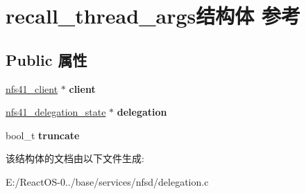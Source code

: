 \hypertarget{structrecall__thread__args}{}\section{recall\+\_\+thread\+\_\+args结构体 参考}
\label{structrecall__thread__args}
\subsection*{Public 属性}
\begin{DoxyCompactItemize}
\item 
\mbox{\label{structrecall__thread__args_a865cb211b2c4e17065676e937819ac7d}} 
\hyperlink{struct____nfs41__client}{nfs41\+\_\+client} $\ast$ {\bfseries client}
\item 
\mbox{\label{structrecall__thread__args_a0ddf7937a5796bd11a87625c82302a4f}} 
\hyperlink{struct____nfs41__delegation__state}{nfs41\+\_\+delegation\+\_\+state} $\ast$ {\bfseries delegation}
\item 
\mbox{\label{structrecall__thread__args_a2860ed2980cf84c8f2a481f0f21e697e}} 
bool\+\_\+t {\bfseries truncate}
\end{DoxyCompactItemize}


该结构体的文档由以下文件生成\+:\begin{DoxyCompactItemize}
\item 
E\+:/\+React\+O\+S-\/0../base/services/nfsd/delegation.\+c\end{DoxyCompactItemize}
